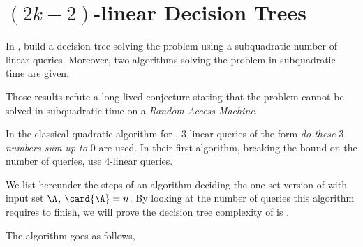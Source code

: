 \section{$(2k-2)$-linear Decision Trees}

In \cite{gronlund:2014}, \citeauthor{gronlund:2014} build a decision tree
solving the \threeSUM problem using a subquadratic number of linear queries.
Moreover, two algorithms solving the \threeSUM problem in subquadratic time are
given.

Those results refute a long-lived conjecture stating that the \threeSUM problem
cannot be solved in subquadratic time on a \emph{Random Access Machine}.

In the classical quadratic algorithm for \threeSUM, $3$-linear queries of the
form \emph{do these $3$ numbers sum up to $0$} are used. In their first
algorithm, breaking the  bound on the number of queries,
\citeauthor{gronlund:2014} use $4$-linear queries.

We list hereunder the steps of an algorithm deciding the one-set
version of \threeSUM with input set $\A$, $\card{\A} = n$. By looking at the
number of queries this algorithm requires to finish, we will prove the
decision tree complexity of \threeSUM is .

The algorithm goes as follows,

